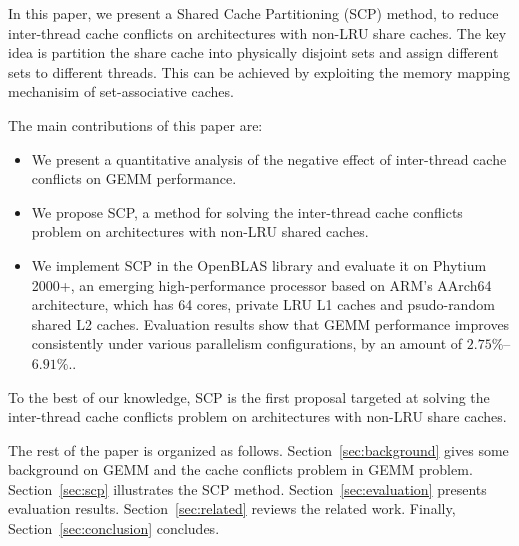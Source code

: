 In this paper, we present a Shared Cache Partitioning (SCP) method,
to reduce inter-thread cache conflicts on architectures with non-LRU share caches.
The key idea is partition the share cache into physically disjoint sets
and assign different sets to different threads. This can be achieved by
exploiting the memory mapping mechanisim of set-associative caches.

The main contributions of this paper are:
\begin{itemize}
\item We present a quantitative analysis of the negative effect of inter-thread cache
  conflicts on GEMM performance.
\item We propose SCP, a method for solving the inter-thread cache conflicts
  problem on architectures with non-LRU shared caches.
\item We implement SCP in the OpenBLAS library and evaluate it on Phytium 2000+,
  an emerging high-performance processor based on ARM's AArch64 architecture,
  which has 64 cores, private LRU L1 caches and psudo-random shared L2 caches.
  Evaluation results show that GEMM performance improves consistently
  under various parallelism configurations, by an amount of $2.75\%$--$6.91\%$..
\end{itemize}

To the best of our knowledge, SCP is the first proposal targeted at
solving the inter-thread cache conflicts problem on
architectures with non-LRU share caches.

The rest of the paper is organized as follows.
Section~\ref{sec:background} gives some background on GEMM and
the cache conflicts problem in GEMM problem.
Section~\ref{sec:scp} illustrates the SCP method.
Section~\ref{sec:evaluation} presents evaluation results.
Section~\ref{sec:related} reviews the related work.
Finally, Section~\ref{sec:conclusion} concludes.
